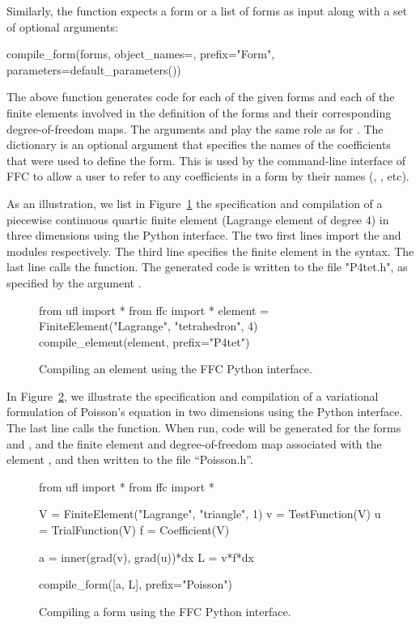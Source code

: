Similarly, the  function expects a form or a list
of forms as input along with a set of optional arguments:
%
\begin{python}
compile_form(forms,
             object_names={},
             prefix="Form",
             parameters=default_parameters())
\end{python}
%
The above function generates code for each of the given forms and each of
the finite elements involved in the definition of the forms and their
corresponding degree-of-freedom maps. The arguments  and
 play the same role as for
. The  dictionary is an optional
argument that specifies the names of the coefficients that were used
to define the form. This is used by the command-line interface of FFC
to allow a user to refer to any coefficients in a form by their names
(, , etc).

As an illustration, we list in Figure~\ref{fig:python:element} the
specification and compilation of a piecewise continuous quartic finite
element (Lagrange element of degree $4$) in three dimensions using the
\ffc{} Python interface. The two first lines import the \ufl{}
and \ffc{} modules respectively. The third line specifies the finite
element in the \ufl{} syntax. The last line calls the \ffc{}
 function. The generated code is written to
the file "P4tet.h", as specified by the argument .

\begin{figure}
  \begin{python}
from ufl import *
from ffc import *
element = FiniteElement("Lagrange", "tetrahedron", 4)
compile_element(element, prefix="P4tet")
  \end{python}
  \caption{Compiling an element using the FFC Python interface.}
  \label{fig:python:element}
\end{figure}

In Figure~\ref{fig:python:form}, we illustrate the specification
and compilation of a variational formulation of Poisson's equation in
two dimensions using the Python interface. The last line
calls the  function. When run, code will be
generated for the forms  and , and the finite
element and degree-of-freedom map associated with the element
, and then written to the file ``Poisson.h''.

\begin{figure}
  \begin{python}
from ufl import *
from ffc import *

V = FiniteElement("Lagrange", "triangle", 1)
v = TestFunction(V)
u = TrialFunction(V)
f = Coefficient(V)

a = inner(grad(v), grad(u))*dx
L = v*f*dx

compile_form([a, L], prefix="Poisson")
  \end{python}
  \caption{Compiling a form using the FFC Python interface.}
  \label{fig:python:form}
\end{figure}

